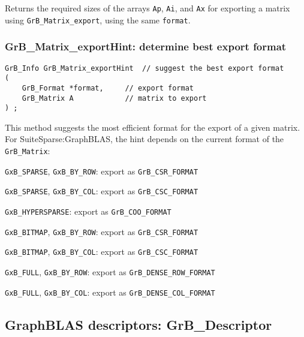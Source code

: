 \documentclass[12pt]{article}
\newenvironment{packed_itemize}{
\begin{itemize}
  \setlength{\itemsep}{1pt}
  \setlength{\parskip}{0pt}
  \setlength{\parsep}{0pt}
}{\end{itemize}}
\begin{document}
Returns the required sizes of the arrays \verb'Ap', \verb'Ai', and \verb'Ax'
for exporting a matrix using \verb'GrB_Matrix_export', using the same
\verb'format'.

\subsubsection{{\sf GrB\_Matrix\_exportHint:} determine best export format}
\label{export_hint}

\begin{mdframed}[userdefinedwidth=6in]
{\footnotesize
\begin{verbatim}
GrB_Info GrB_Matrix_exportHint  // suggest the best export format
(
    GrB_Format *format,     // export format
    GrB_Matrix A            // matrix to export
) ;
\end{verbatim}
} \end{mdframed}

This method suggests the most efficient format for the export of a given
matrix.  For SuiteSparse:GraphBLAS, the hint depends on the current
format of the \verb'GrB_Matrix':

\begin{packed_itemize}
\item \verb'GxB_SPARSE', \verb'GxB_BY_ROW': export as \verb'GrB_CSR_FORMAT'
\item \verb'GxB_SPARSE', \verb'GxB_BY_COL': export as \verb'GrB_CSC_FORMAT'
\item \verb'GxB_HYPERSPARSE': export as \verb'GrB_COO_FORMAT'
\item \verb'GxB_BITMAP', \verb'GxB_BY_ROW': export as \verb'GrB_CSR_FORMAT'
\item \verb'GxB_BITMAP', \verb'GxB_BY_COL': export as \verb'GrB_CSC_FORMAT'
\item \verb'GxB_FULL', \verb'GxB_BY_ROW': export as \verb'GrB_DENSE_ROW_FORMAT'
\item \verb'GxB_FULL', \verb'GxB_BY_COL': export as \verb'GrB_DENSE_COL_FORMAT'
\end{packed_itemize}

\newpage
\subsection{GraphBLAS descriptors: {\sf GrB\_Descriptor}} %
\label{descriptor}
\end{document}
